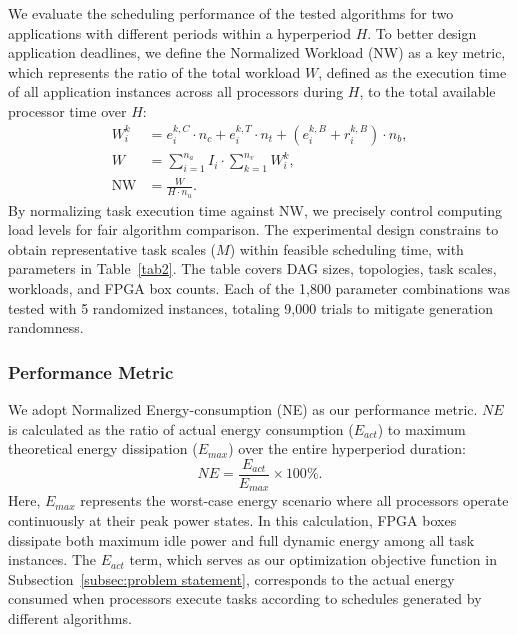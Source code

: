 \documentclass{IEEEtaes}
\begin{document}
We evaluate the scheduling performance of the tested algorithms for two applications with different periods within a hyperperiod $H$. To better design application deadlines, we define the Normalized Workload (NW) as a key metric, which represents the ratio of the total workload $W$, defined as the execution time of all application instances across all processors during $H$, to the total available processor time over $H$:
\begin{subequations}
\begin{align}
    W_{i}^{k}&=e_{i}^{k,C}\cdot n_c + e_{i}^{k,T}\cdot n_t + (e_{i}^{k,B}+r_{i}^{k,B})\cdot n_b,\\
    W &= \sum\limits_{i=1}^{n_a}I_i\cdot \sum\limits_{k=1}^{n_v}W_{i}^{k},\\
    \text{NW} &= \frac{W}{H\cdot n_u}.
\end{align}
\end{subequations}
By normalizing task execution time against NW, we precisely control computing load levels for fair algorithm comparison. The experimental design constrains  to obtain representative task scales ($M$) within feasible scheduling time, with parameters in Table~\ref{tab2}. The table covers DAG sizes, topologies, task scales, workloads, and FPGA box counts. Each of the 1,800 parameter combinations was tested with 5 randomized instances, totaling 9,000 trials to mitigate generation randomness.

\subsubsection{Performance Metric}We adopt Normalized Energy-consumption (NE) as our performance metric. $NE$ is calculated as the ratio of actual energy consumption ($E_{act}$) to maximum theoretical energy dissipation ($E_{max}$) over the entire hyperperiod duration:
\begin{equation}
    NE = \frac{E_{act}}{E_{max}}\times 100\%.
\end{equation}
Here, $E_{max}$ represents the worst-case energy scenario where all processors operate continuously at their peak power states. In this calculation, FPGA boxes dissipate both maximum idle power and full dynamic energy among all task instances. The $E_{act}$ term, which serves as our optimization objective function in Subsection~\ref{subsec:problem statement}, corresponds to the actual energy consumed when processors execute tasks according to schedules generated by different algorithms.
\end{document}
